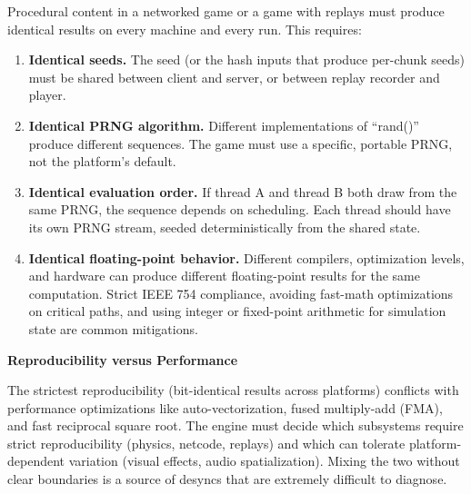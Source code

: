 \documentclass[
  11pt,
  letterpaper,
  DIV=11,
  numbers=noendperiod,
  twoside,
  open=right]{scrreprt}
\providecommand{\tightlist}{%
  \setlength{\itemsep}{0pt}\setlength{\parskip}{0pt}}
\begin{document}
Procedural content in a networked game or a game with replays must
produce identical results on every machine and every run. This requires:

\begin{enumerate}
\def\labelenumi{\arabic{enumi}.}
\tightlist
\item
  \textbf{Identical seeds.} The seed (or the hash inputs that produce
  per-chunk seeds) must be shared between client and server, or between
  replay recorder and player.
\item
  \textbf{Identical PRNG algorithm.} Different implementations of
  ``rand()'' produce different sequences. The game must use a specific,
  portable PRNG, not the platform's default.
\item
  \textbf{Identical evaluation order.} If thread A and thread B both
  draw from the same PRNG, the sequence depends on scheduling. Each
  thread should have its own PRNG stream, seeded deterministically from
  the shared state.
\item
  \textbf{Identical floating-point behavior.} Different compilers,
  optimization levels, and hardware can produce different floating-point
  results for the same computation. Strict IEEE 754 compliance, avoiding
  fast-math optimizations on critical paths, and using integer or
  fixed-point arithmetic for simulation state are common mitigations.
\end{enumerate}

\begin{tcolorbox}[enhanced jigsaw, arc=.35mm, bottomrule=.15mm, breakable, colback=white, colframe=quarto-callout-warning-color-frame, left=2mm, leftrule=.75mm, opacityback=0, rightrule=.15mm, toprule=.15mm]
\begin{minipage}[t]{5.5mm}
\textcolor{quarto-callout-warning-color}{\faExclamationTriangle}
\end{minipage}%
\begin{minipage}[t]{\textwidth - 5.5mm}

\vspace{-3mm}\textbf{Reproducibility versus Performance}\vspace{3mm}

The strictest reproducibility (bit-identical results across platforms)
conflicts with performance optimizations like auto-vectorization, fused
multiply-add (FMA), and fast reciprocal square root. The engine must
decide which subsystems require strict reproducibility (physics,
netcode, replays) and which can tolerate platform-dependent variation
(visual effects, audio spatialization). Mixing the two without clear
boundaries is a source of desyncs that are extremely difficult to
diagnose.

\end{minipage}%
\end{tcolorbox}
\end{document}
